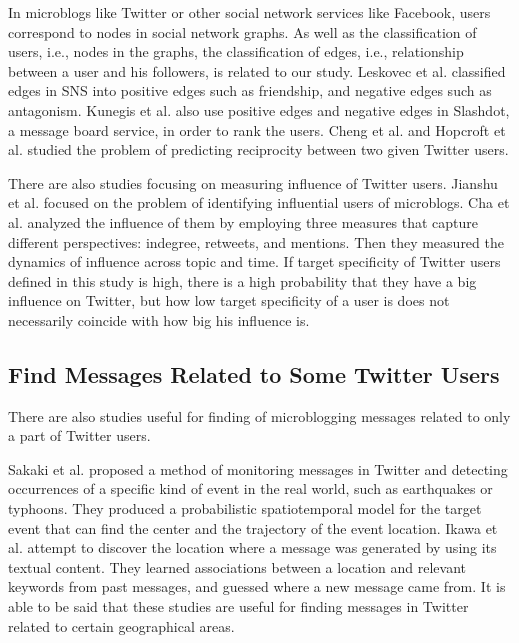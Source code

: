 In microblogs like Twitter or other social network services
like Facebook, users correspond to nodes in social network graphs. As
well as the classification of users, i.e., nodes in the graphs, the
classification of edges, i.e., relationship between a user and his
followers, is related to our study. Leskovec et
al.\cite{leskovec2010predicting,leskovec2010signed} classified edges in
SNS into positive edges such as friendship, and negative edges such as
antagonism. Kunegis et al.\cite{kunegis2009slashdot} also use positive
edges and negative edges in Slashdot, a message board service, in order
to rank the users. Cheng et al.\cite{cheng2011predicting} and Hopcroft
et al.\cite{hopcroft2011will} studied the problem of predicting
reciprocity between two given Twitter users.

There are also studies focusing on measuring influence of Twitter
users.  Jianshu et al.\cite{weng2010twitterrank} focused on the problem of
identifying influential users of microblogs.  Cha et
al.\cite{cha2010measuring} analyzed the influence of them
by employing three measures that capture different perspectives:
indegree, retweets, and mentions.  Then they measured the dynamics of
influence across topic and time.  If target specificity of Twitter users
defined in this study is high, there is a high probability that they
have a big influence on Twitter, but how low target specificity of a
user is does not necessarily coincide with how big his influence is.

\subsection{Find Messages Related to Some Twitter Users}
\label{subsec:Some User}

There are also studies useful for finding of microblogging messages
related to only a part of Twitter users.

Sakaki et al.\cite{sakaki2010earthquake} proposed a method of monitoring
messages in Twitter and detecting occurrences of a specific kind of event
in the real world, such as earthquakes or typhoons.  They produced a
probabilistic spatiotemporal model for the target event that can find
the center and the trajectory of the event location.  Ikawa et
al.\cite{ikawa2012location} attempt to discover the location where a
message was generated by using its textual content.  They learned
associations between a location and relevant keywords from past
messages, and guessed where a new message came from.  It is able to be
said that these studies are useful for finding messages in Twitter
related to certain geographical areas.

